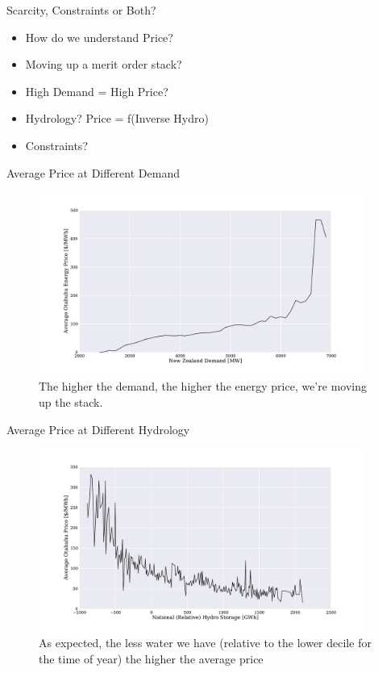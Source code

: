 \documentclass[xcolor=x11names,compress]{beamer}
\renewcommand{\(}{\begin{columns}}
\renewcommand{\)}{\end{columns}}
\newcommand{\<}[1]{\begin{column}{#1}}
\renewcommand{\>}{\end{column}}
\begin{document}
\begin{frame}{Scarcity, Constraints or Both?}
\begin{itemize}
\item How do we understand Price?
\item Moving up a merit order stack?
\item High Demand = High Price?
\item Hydrology? Price = f(Inverse Hydro)
\item Constraints?
\end{itemize}
\end{frame}

\begin{frame}{Average Price at Different Demand}
\begin{figure}
\includegraphics[width=0.95\textwidth]{img/price_vs_demand.pdf}
\caption{The higher the demand, the higher the energy price, we're moving up
the stack.}
\end{figure}
\end{frame}

\begin{frame}{Average Price at Different Hydrology}
\begin{figure}
\includegraphics[width=0.95\textwidth]{img/price_and_hydrology.pdf}
\caption{As expected, the less water we have (relative to the lower decile
for the time of year) the higher the average price}
\end{figure}
\end{frame}
\end{document}
